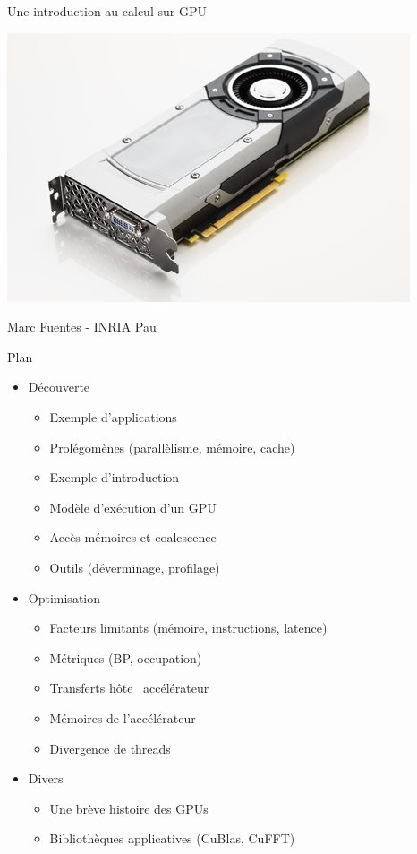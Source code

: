\documentclass[11pt,mathserif]{beamer}
\newcommand{\geziBikoitz}{\faArrowsH}
\begin{document}
\begin{frame}
\begin{center}
  {\Large Une introduction au calcul sur GPU} 
\end{center}
\begin{center}
\includegraphics[width=0.5\linewidth]{fig/gpu.jpg}
\end{center}
\begin{center}
{\large Marc Fuentes - INRIA Pau\\ }
\end{center}
\end{frame}

\begin{frame}{Plan}
\begin{itemize}[<+->]
   \item Découverte
     \begin{itemize}
       \item Exemple d'applications 
       \item Prolégomènes (parallèlisme, mémoire, cache)
       \item Exemple d'introduction
       \item Modèle d'exécution d'un GPU
       \item Accès mémoires et coalescence
       \item Outils (déverminage, profilage)
     \end{itemize}
 \item Optimisation 
     \begin{itemize}
       \item Facteurs limitants (mémoire, instructions, latence)
       \item Métriques (BP, occupation)
       \item Transferts hôte \geziBikoitz\ accélérateur
       \item Mémoires de l'accélérateur
       \item Divergence de threads
     \end{itemize}
  \item Divers
     \begin{itemize}
       \item Une brève histoire des GPUs
       \item Bibliothèques applicatives (CuBlas, CuFFT)
     \end{itemize}
\end{itemize}
\end{frame}
\end{document}
